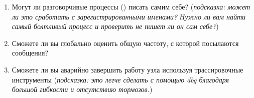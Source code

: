 \begin{enumerate}
	\item Могут ли разговорчивые процессы () писать самим себе? (\emph{подсказка: может ли это сработать с зарегистрированными именами? Нужно ли вам найти самый болтливый процесс и проверить не пишет ли он сам себе?})
	\item Сможете ли вы глобально оценить общую частоту, с которой посылаются сообщения?
	\item Сможете ли вы аварийно завершить работу узла используя трассировочные инструменты (\emph{подсказка: это легче сделать с помощью dbg благодаря большой гибкости и отсутствию тормозов.})
\end{enumerate}



